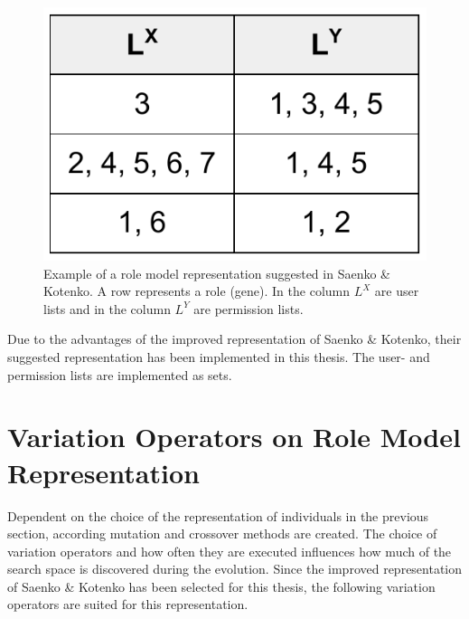         \begin{figure}
            \centering
            \includegraphics[scale=0.4]{./Figures/ComplexRepresentation2}
            \caption{Example of a role model representation suggested in Saenko \& Kotenko\cite{saenko2012design}. A row represents a role (gene). In the column $L^X$ are user lists and in the column $L^Y$ are permission lists.}
            \label{fig:representation3}
        \end{figure}
        Due to the advantages of the improved representation of Saenko \& Kotenko\cite{saenko2012design}, their suggested representation has been implemented in this thesis. The user- and permission lists are implemented as sets.
    
    \section{Variation Operators on Role Model Representation}
    Dependent on the choice of the representation of individuals in the previous section, according mutation and crossover methods are created. The choice of variation operators and how often they are executed influences how much of the search space is discovered during the evolution. Since the improved representation of Saenko \& Kotenko\cite{saenko2012design} has been selected for this thesis, the following variation operators are suited for this representation.
